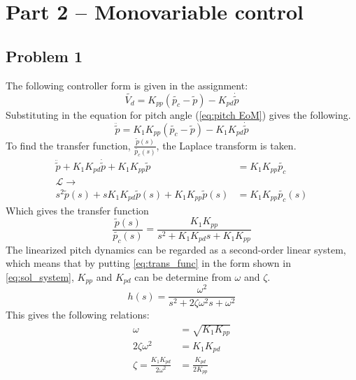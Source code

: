 
\section{Part 2 -- Monovariable control}
%
\subsection{Problem 1}
The following controller form is given in the assignment\cite[p.15]{assignment}:
%
\begin{equation}
  \label{eq:pd_controller}
  \tilde{V_d} = K_{pp}(\tilde{p_c} - \tilde{p}) - K_{pd} \dot{\tilde{p}}
\end {equation}
%
Substituting in the equation for pitch
angle (\cref{eq:pitch EoM}) gives the following.
%
\begin{equation}
  \label{eq:pitch_with_pd}
  \ddot{\tilde{p}} = K_1 K_{pp}(\tilde{p_c} - \tilde{p}) - K_1 K_{pd}
  \dot{\tilde{p}}
\end{equation}
%
To find the transfer
function, $\frac{\tilde{p}(s)}{\tilde{p_c}(s)}$, the Laplace transform
is taken.
%
\begin{align*}
  \ddot{\tilde{p}} + K_1 K_{pd}\dot{\tilde{p}}
  + K_1K_{pp}\tilde{p} &= K_1 K_{pp}\tilde{p_c} \\
  \mathcal{L}\rightarrow&  \\
  s^2\tilde{p}(s) + sK_1K_{pd}\tilde{p}(s)
  + K_1K_{pp}\tilde{p}(s) &= K_1K_{pp}\tilde{p_c}(s)
\end{align*}
%
Which gives the transfer function
%
\begin{equation}
  \label{eq:trans_func}
  \frac{\tilde{p}(s)}{\tilde{p_c}(s)} =
  \frac{K_1K_{pp}}{s^2+K_1K_{pd}s+K_1K_{pp}}
\end{equation}
%
The linearized pitch dynamics can be regarded as a second-order linear
system, which means that by putting \cref{eq:trans_func} in the form
shown in \cref{eq:sol_system}, $K_{pp}$ and $K_{pd}$ can be determine
from $\omega$ and $\zeta$.
%
\begin{equation}
  \label{eq:sol_system}
  h(s) = \frac{\omega^2}{s^2+2\zeta\omega^2s+\omega^2}
\end{equation}
%
This gives the following relations:
%
\begin{align}
  \label{eq:omega}
  \omega &= \sqrt{K_ 1K_ {pp}} \\
  2\zeta\omega^2 &= K_ 1K_ {pd} \nonumber \\
  \label{eq:zeta}
  \zeta = \frac{K_ 1K_ {pd}}{2\omega^2} &= \frac{K_{pd}}{2K_{pp}}
\end{align}
